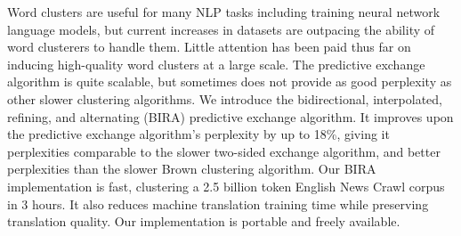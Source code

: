 Word clusters are useful for many NLP tasks including training neural network language models, but current increases in datasets are outpacing the ability of word clusterers to handle them.  Little attention has been paid thus far on inducing high-quality word clusters at a large scale.  The predictive exchange algorithm is quite scalable, but sometimes does not provide as good perplexity as other slower clustering algorithms. We introduce the bidirectional, interpolated, refining, and alternating (BIRA) predictive exchange algorithm.              It improves upon the predictive exchange algorithm's perplexity by up to 18\%, giving it perplexities comparable to the slower two-sided exchange algorithm, and better perplexities than the slower Brown clustering algorithm.  Our BIRA implementation is fast, clustering a 2.5 billion token English News Crawl corpus in 3 hours.  It also reduces machine translation training time while preserving translation quality.  Our implementation is portable and freely available.
